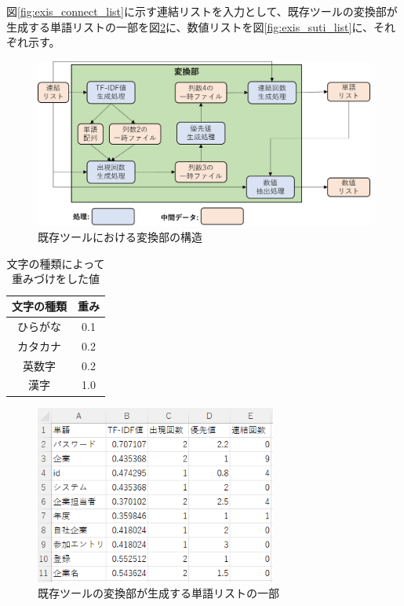 図\ref{fig:exis_connect_list}に示す連結リストを入力として、既存ツールの変換部が生成する単語リストの一部を図\ref{fig:exis_word_list}に、数値リストを図\ref{fig:exis_suti_list}に、それぞれ示す。

\begin{figure}[p]
    \begin{center}
        \includegraphics[width=1.0\columnwidth]{image/exis_transfer_structure.png}
        \caption{既存ツールにおける変換部の構造}
        \label{fig:exis_transfer_structure}
    \end{center}
\end{figure}

\begin{table}[p]
    \begin{center}      
        \caption{文字の種類によって重みづけをした値}\label{table:yusenti}
        \begin{tabular}{c|c}
        文字の種類  & 重み \\ \hline \hline
        ひらがな & 0.1 \\ \hline
        カタカナ	 & 0.2\\ \hline
        英数字  & 0.2\\ \hline
        漢字 & 1.0\\ \hline
        \end{tabular}
    \end{center}
\end{table}

\begin{figure}[tp]
    \begin{center}
        \includegraphics[width=300]{image/exis_word_list.png}
        \caption{既存ツールの変換部が生成する単語リストの一部}
        \label{fig:exis_word_list}
    \end{center}
\end{figure}

